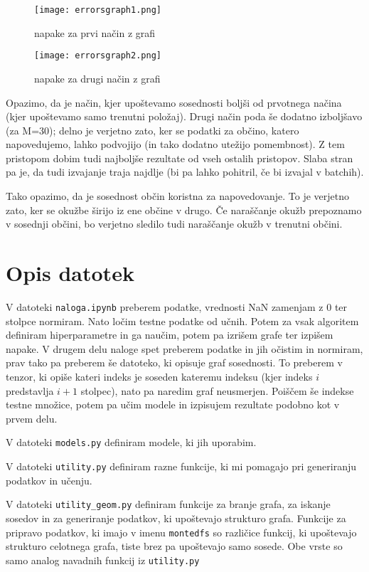 \documentclass{article}
\begin{document}
\begin{figure}[htb]
        \texttt{[image: errorsgraph1.png]}
        \caption{napake za prvi način z grafi}
    \end{figure}

    \begin{figure}[htb]
        \texttt{[image: errorsgraph2.png]}
        \caption{napake za drugi način z grafi}
    \end{figure}

Opazimo, da je način, kjer upoštevamo sosednosti boljši od prvotnega načina (kjer upoštevamo samo trenutni položaj). Drugi način poda še dodatno izboljšavo (za M=30); delno je verjetno zato, ker se podatki za občino, katero napovedujemo, lahko podvojijo (in tako dodatno utežijo pomembnost). Z tem pristopom dobim tudi najboljše rezultate od vseh ostalih pristopov. Slaba stran pa je, da tudi izvajanje traja najdlje (bi pa lahko pohitril, če bi izvajal v batchih).

Tako opazimo, da je sosednost občin koristna za napovedovanje. To je verjetno zato, ker se okužbe širijo iz ene občine v drugo. Če naraščanje okužb prepoznamo v sosednji občini, bo verjetno sledilo tudi naraščanje okužb v trenutni občini.

\section{Opis datotek}
V datoteki \texttt{naloga.ipynb} preberem podatke, vrednosti NaN zamenjam z 0 ter stolpce normiram. Nato ločim testne podatke od učnih. Potem za vsak algoritem definiram hiperparametre in ga naučim, potem pa izrišem grafe ter izpišem napake. V drugem delu naloge spet preberem podatke in jih očistim in normiram, prav tako pa preberem še datoteko, ki opisuje graf sosednosti. To preberem v tenzor, ki opiše kateri indeks je soseden kateremu indeksu (kjer indeks \(i\) predstavlja \(i+1\) stolpec), nato pa naredim graf neusmerjen. Poiščem še indekse testne množice, potem pa učim modele in izpisujem rezultate podobno kot v prvem delu.

V datoteki \texttt{models.py} definiram modele, ki jih uporabim.

V datoteki \texttt{utility.py} definiram razne funkcije, ki mi pomagajo pri generiranju podatkov in učenju.

V datoteki \texttt{utility\_geom.py} definiram funkcije za branje grafa, za iskanje sosedov in za generiranje podatkov, ki upoštevajo strukturo grafa. Funkcije za pripravo podatkov, ki imajo v imenu \texttt{montedfs} so različice funkcij, ki upoštevajo strukturo celotnega grafa, tiste brez pa upoštevajo samo sosede. Obe vrste so samo analog navadnih funkcij iz \texttt{utility.py}
\end{document}
